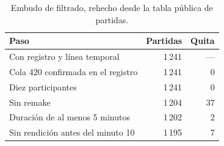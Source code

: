 \begin{table}[H]
\centering\small
\caption{Embudo de filtrado, rehecho desde la tabla pública de partidas.}
\label{tab:embudo}
\begin{tabular}{lrr}
\toprule
Paso & Partidas & Quita \\
\midrule
Con registro y línea temporal & 1\,241 & — \\
Cola 420 confirmada en el registro & 1\,241 & 0 \\
Diez participantes & 1\,241 & 0 \\
Sin remake & 1\,204 & 37 \\
Duración de al menos 5 minutos & 1\,202 & 2 \\
Sin rendición antes del minuto 10 & 1\,195 & 7 \\
\bottomrule
\end{tabular}
\end{table}
